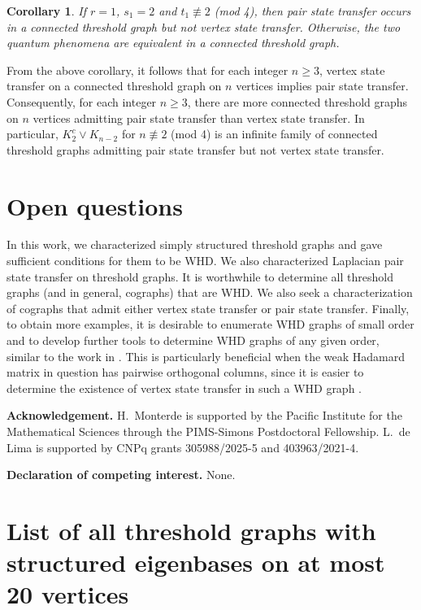\documentclass[preprint]{elsarticle}
\newtheorem{corollary}[theorem]{Corollary}
\begin{document}
\begin{corollary}
If $r=1$, $s_1=2$ and $t_1\not\equiv 2$ (mod 4), then pair state transfer occurs in a connected threshold graph but not vertex state transfer. Otherwise, the two quantum phenomena are equivalent in a connected threshold graph.
\end{corollary}

From the above corollary, it follows that for each integer $n\geq 3$, vertex state transfer on a connected threshold graph on $n$ vertices implies pair state transfer. Consequently, for each integer $n\geq 3$, there are more connected threshold graphs on $n$ vertices admitting pair state transfer than vertex state transfer. In particular,  $K_2^c\vee K_{n-2}$ for $n\not\equiv 2$ (mod 4) is an infinite family of connected threshold graphs admitting pair state transfer but not vertex state transfer. 

\section{Open questions}
\label{sec:6}

In this work, we characterized simply structured threshold graphs and gave sufficient conditions for them to be WHD. We also characterized Laplacian pair state transfer on threshold graphs. It is worthwhile to determine all threshold graphs (and in general, cographs) that are WHD. We also seek a characterization of cographs that admit either vertex state transfer or pair state transfer. Finally, to obtain more examples, it is desirable to enumerate WHD graphs of small order and to develop further tools to determine WHD graphs of any given order, similar to the work in \cite{breen}. This is particularly beneficial when the weak Hadamard matrix in question has pairwise orthogonal columns, since it is easier to determine the existence of vertex state transfer in such a WHD graph \cite{WeakMatrices}.

\bigskip

\noindent \textbf{Acknowledgement.}
H.~Monterde is supported by the Pacific Institute for the Mathematical Sciences through the PIMS-Simons Postdoctoral Fellowship. L.~de Lima is supported by CNPq grants 305988/2025-5 and 403963/2021-4.

\bigskip

\noindent \textbf{Declaration of competing interest.} None.

\appendix 

\section{List of all threshold graphs with structured eigenbases on at most 20 vertices}
\end{document}
